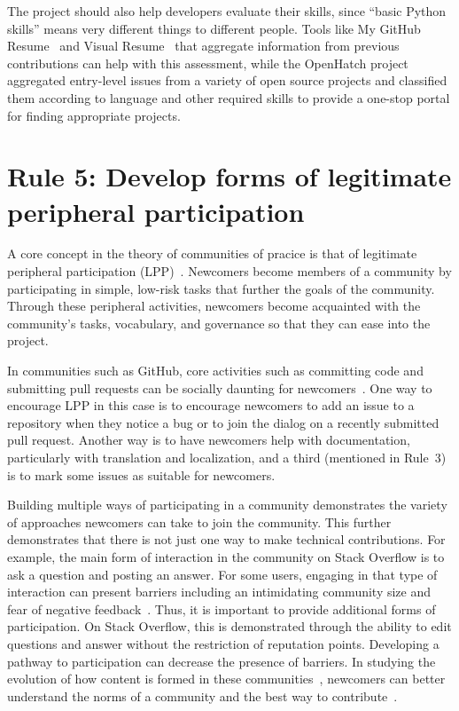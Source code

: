 \documentclass[10pt,letterpaper]{article}
\newcommand{\rulemajor}[1]{\section*{#1}}
\begin{document}
The project should also help developers evaluate their skills,
since ``basic Python skills'' means very different things to different people.
Tools like My GitHub Resume~\cite{my-github-resume} and Visual Resume~\cite{sarma2016}
that aggregate information from previous contributions can help with this assessment,
while the OpenHatch project~\cite{openhatch} aggregated entry-level issues from a variety of open source projects
and classified them according to language and other required skills
to provide a one-stop portal for finding appropriate projects.

\rulemajor{Rule 5: Develop forms of legitimate peripheral participation}

A core concept in the theory of communities of pracice is that of
legitimate peripheral participation (LPP)~\cite{lave1991,wenger1999}.
Newcomers become members of a community by participating in simple, low-risk tasks
that further the goals of the community.
Through these peripheral activities,
newcomers become acquainted with the community's tasks, vocabulary, and governance
so that they can ease into the project.

In communities such as GitHub,
core activities such as committing code and submitting pull requests can be socially daunting for newcomers~\cite{steinmacher2015}.
One way to encourage LPP in this case is to encourage newcomers to add an issue to a repository when they notice a bug
or to join the dialog on a recently submitted pull request.
Another way is to have newcomers help with documentation,
particularly with translation and localization,
and a third (mentioned in Rule~3) is to mark some issues as suitable for newcomers.

Building multiple ways of participating in a community demonstrates the variety of approaches newcomers can take to join the community.
This further demonstrates that there is not just one way to make technical contributions.
For example,
the main form of interaction in the community on Stack Overflow is to ask a question and posting an answer.
For some users,
engaging in that type of interaction can present barriers including an intimidating community size and fear of negative feedback~\cite{ford2016}.
Thus, it is important to provide additional forms of participation.
On Stack Overflow, this is demonstrated through the ability to edit questions and answer without the restriction of reputation points.
Developing a pathway to participation can decrease the presence of barriers.
In studying the evolution of how content is formed in these communities~\cite{baltes2018},
newcomers can better understand the norms of a community and the best way to contribute~\cite{ford2018}.
\end{document}
